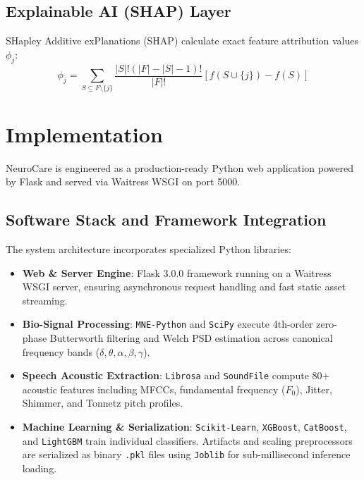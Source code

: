 \documentclass[conference]{IEEEtran}
\begin{document}
\subsection{Explainable AI (SHAP) Layer}
SHapley Additive exPlanations (SHAP) calculate exact feature attribution values $\phi_j$:
\begin{equation}
\phi_j = \sum_{S \subseteq F \setminus \{j\}} \frac{|S|!(|F| - |S| - 1)!}{|F|!} \left[f(S \cup \{j\}) - f(S)\right]
\end{equation}

\section{Implementation}
NeuroCare is engineered as a production-ready Python web application powered by Flask and served via Waitress WSGI on port 5000.

\subsection{Software Stack and Framework Integration}
The system architecture incorporates specialized Python libraries:
\begin{itemize}
    \item \textbf{Web & Server Engine}: Flask 3.0.0 framework running on a Waitress WSGI server, ensuring asynchronous request handling and fast static asset streaming.
    \item \textbf{Bio-Signal Processing}: \texttt{MNE-Python} and \texttt{SciPy} execute 4th-order zero-phase Butterworth filtering and Welch PSD estimation across canonical frequency bands ($\delta, \theta, \alpha, \beta, \gamma$).
    \item \textbf{Speech Acoustic Extraction}: \texttt{Librosa} and \texttt{SoundFile} compute 80+ acoustic features including MFCCs, fundamental frequency ($F_0$), Jitter, Shimmer, and Tonnetz pitch profiles.
    \item \textbf{Machine Learning \& Serialization}: \texttt{Scikit-Learn}, \texttt{XGBoost}, \texttt{CatBoost}, and \texttt{LightGBM} train individual classifiers. Artifacts and scaling preprocessors are serialized as binary \texttt{.pkl} files using \texttt{Joblib} for sub-millisecond inference loading.
\end{itemize}
\end{document}
